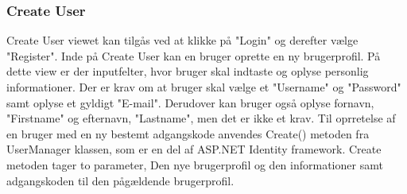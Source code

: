 \subsubsection{Create User}

Create User viewet kan tilgås ved at klikke på "Login" og derefter vælge "Register". Inde på Create User kan en bruger oprette en ny brugerprofil. På dette view er der inputfelter, hvor bruger skal indtaste og oplyse personlig informationer. Der er krav om at bruger skal vælge et "Username" og "Password" samt oplyse et gyldigt "E-mail". Derudover kan bruger også oplyse fornavn, "Firstname" og efternavn, "Lastname", men det er ikke et krav. 
Til oprretelse af en bruger med en ny bestemt adgangskode anvendes Create() metoden fra UserManager klassen, som er en del af ASP.NET Identity framework. Create metoden tager to parameter, Den nye brugerprofil og den informationer samt adgangskoden til den pågældende brugerprofil. 